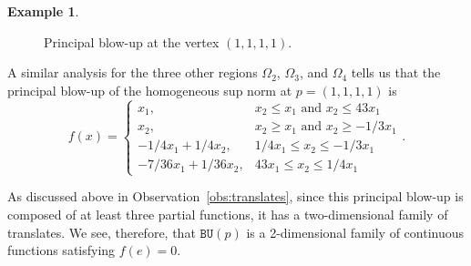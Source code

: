 \documentclass{article}
\theoremstyle{definition}
\newtheorem{ex}[theorem]{Example}
\newcommand{\BU}{\mathtt{BU}}
\begin{document}
\begin{ex}
\begin{figure}[h]
\begin{tikzpicture}[scale = 1]
\end{tikzpicture}
\caption{Principal blow-up at the vertex $(1,1,1,1)$.}\label{fig:example1}
\end{figure}

A similar analysis for the three other regions $\Omega_2$, $\Omega_3$, and $\Omega_4$ tells us that the principal blow-up of the homogeneous sup norm at $p = (1,1,1,1)$ is
\[
f(x) = \begin{cases}
x_1, & x_2 \leq x_1 \text{ and } x_2 \leq 43x_1\\
x_2, & x_2 \geq x_1 \text{ and } x_2 \geq -1/3x_1\\
-1/4x_1 + 1/4x_2, &  1/4x_1 \leq x_2 \leq -1/3x_1 \\
-7/36x_1 + 1/36x_2, &  43x_1 \leq x_2 \leq 1/4x_1
\end{cases}.
\]

As discussed above in Observation~\ref{obs:translates}, since this principal blow-up is composed of at least three partial functions, it has a two-dimensional family of translates. We see, therefore, that $\BU(p)$ is a 2-dimensional family of continuous functions satisfying $f(e) = 0$.

\end{ex}
\end{document}
